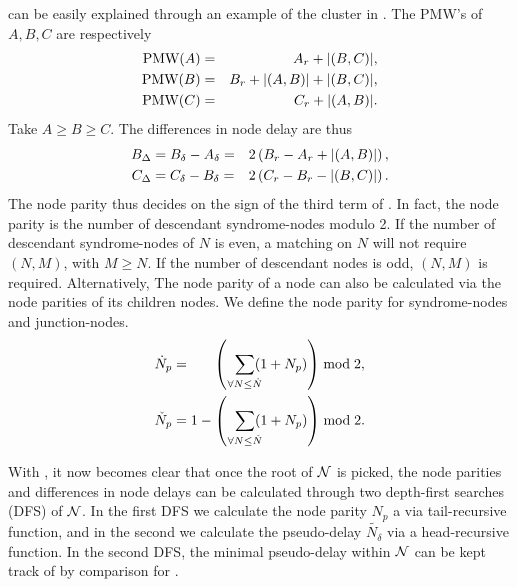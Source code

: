  can be easily explained through an example of the cluster in . The PMW's of $A, B, C$ are respectively 
\begin{eqnarray}
    \nonumber \text{PMW}(A) &=& A_r + \lvert(B, C)\rvert, \\
    \nonumber \text{PMW}(B) &=& B_r + \lvert(A, B)\rvert + \lvert(B, C)\rvert, \\
    \nonumber \text{PMW}(C) &=& C_r + \lvert(A, B)\rvert.
\end{eqnarray}
Take $A\geq B\geq C$. The differences in node delay are thus 
\begin{eqnarray}
    \nonumber B_\Delta &= B_\delta - A_\delta =& 2\left(B_r - A_r + \lvert(A, B)\rvert\right), \\
    \nonumber C_\Delta &= C_\delta - B_\delta =& 2\left(C_r - B_r - \lvert(B, C)\rvert\right).
\end{eqnarray}
The node parity thus decides on the sign of the third term of . In fact, the node parity is the number of descendant syndrome-nodes modulo 2. If the number of descendant syndrome-nodes of $N$ is even, a matching on $N$ will not require $(N,M)$, with $M\geq N$. If the number of descendant nodes is odd, $(N,M)$ is required. Alternatively, The node parity of a node can also be calculated via the node parities of its children nodes. We define the node parity for syndrome-nodes and junction-nodes. 
\begin{align}
    \dot{N}_p &= \hspace{.6cm}\left(\hspace{.2cm} \sum_{\mathclap{\forall N \leq \dot{N}}} (1+N_p) \right ) \bmod 2, \label{eq:snodeparity}\\
    \check{N}_p &= 1 - \left(\hspace{.2cm} \sum_{\mathclap{\forall N \leq \check{N}}} (1+N_p) \right) \bmod 2. \label{eq:jnodeparity}
\end{align}

With , it now becomes clear that once the root of $\mathcal{N}$ is picked, the node parities and differences in node delays can be calculated through two depth-first searches (DFS) of $\mathcal{N}$. In the first DFS we calculate the node parity $N_p$ a via tail-recursive function, and in the second we calculate the pseudo-delay $\tilde{N_\delta}$ via a head-recursive function. In the second DFS, the minimal pseudo-delay within $\mathcal{N}$ can be kept track of by comparison for . 

